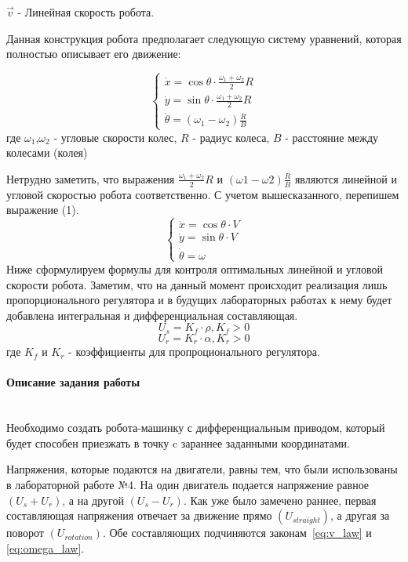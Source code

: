 \documentclass[12pt,a4paper,openany]{extarticle}
\begin{document}
$\vec{v}$ - Линейная скорость робота.

Данная конструкция робота предполагает следующую систему уравнений, которая полностью описывает его движение:

\begin{equation}
 \begin{cases}
	\dot{x} = \cos{\theta} \cdot \frac{\omega_1 + \omega_2}{2}R\\
	\dot{y} = \sin{\theta} \cdot \frac{\omega_1 + \omega_2}{2}R\\
	\dot{\theta} = (\omega_1 - \omega_2)\frac{R}{B}
 \end{cases}
\end{equation}
где $\omega_1$,$\omega_2$ - угловые скорости колес, $R$ - радиус колеса, $B$ - расстояние между колесами (колея)

Нетрудно заметить, что выражения $\frac{\omega_1+\omega_2}{2}R$ и $(\omega1-\omega2)\frac{R}{B}$ являются линейной и угловой скоростью робота соответственно. С учетом вышесказанного, перепишем выражение (1).
\begin{equation}\label{eq:model}
 \begin{cases}
	\dot{x} = \cos{\theta} \cdot V\\
	\dot{y} = \sin{\theta} \cdot V\\
	\dot{\theta} = \omega
 \end{cases}
\end{equation}
Ниже сформулируем формулы для контроля оптимальных линейной и угловой скорости робота. Заметим, что на данный момент происходит реализация лишь пропорционального регулятора и в будущих лабораторных работах к нему будет добавлена интегральная и дифференциальная составляющая.
\begin{equation}\label{eq:v_law}
 U_s = K_f \cdot \rho,    K_f > 0
\end{equation}
\begin{equation}\label{eq:omega_law}
 U_r = K_r \cdot \alpha,    K_r > 0
\end{equation}
где $K_f$ и $K_r$ - коэффициенты для пропроционального регулятора.
\paragraph*{Описание задания работы}$\phantom{-}$\\
Необходимо создать робота-машинку с дифференциальным приводом, который будет способен приезжать в точку c зараннее заданными координатами.

Напряжения, которые подаются на двигатели, равны тем, что были использованы в лабораторной работе №4. На один двигатель подается напряжение равное $(U_s + U_r)$, а на другой $(U_s - U_r)$. Как уже было замечено раннее, первая составляющая напряжения отвечает за движение прямо $(U_{straight})$, а другая за поворот $(U_{rotation})$. Обе составляющих подчиняются законам~\eqref{eq:v_law} и \eqref{eq:omega_law}.
\end{document}
